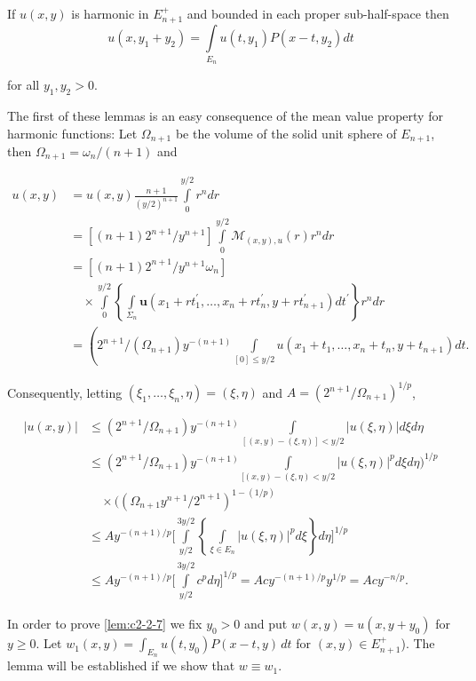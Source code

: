 \begin{lemma}
\label{lem:c2-2-7}
If $u(x, y)$ is harmonic in $E_{n+1}^{+}$ and bounded in each proper sub-half-space then
\[
u(x,y_{1}+y_{2})=\int\limits_{E_{n}}u(t,y_{1})P(x-t,y_{2})dt
\]

for all $y_{1}, y_{2} > 0$.
\end{lemma}

The first of these lemmas is an easy consequence of the mean value property for harmonic functions: Let $\Omega_{n+1}$ be the volume of the solid unit sphere of $E_{n+1}$, then $\Omega_{n+1} = \omega_n/(n+1)$ and

\[
\begin{aligned}u(x,y)&=u(x,y)\frac{n+1}{(y/2)^{n+1}}\int\limits_{0}^{y/2}r^{n} dr\\&=\left[(n+1)2^{n+1}/y^{n+1}\right]\int\limits_{0}^{y/2}\mathcal{M}_{(x,y),u}(r)r^{n} dr\\&=\left[(n+1)2^{n+1}/y^{n+1}\omega_{n}\right]\\&\quad\times\int\limits_{0}^{y/2}\left\{\int\limits_{\Sigma_{n}}\boldsymbol{u}(x_{1}+rt_{1}^{\prime},\ldots,x_{n}+rt_{n}^{\prime},y+rt_{n+1}^{\prime})dt^{\prime}\right\}r^{n} dr\\&=\left(2^{n+1}/(\Omega_{n+1})y^{-(n+1)}\int\limits_{[0]\leq y/2}u(x_{1}+t_{1},\ldots,x_{n}+t_{n},y+t_{n+1})dt.\right.\end{aligned}
\]

Consequently, letting $(\xi_1, \ldots, \xi_n, \eta) = (\xi, \eta)$ and $A = (2^{n+1}/\Omega_{n+1})^{1/p}$,

\[
\begin{aligned}|u(x,y)|&\leq(2^{n+1}/\Omega_{n+1})y^{-(n+1)}\int\limits_{[(x,y)-(\xi,\eta)]<y/2}|u(\xi,\eta)|d\xi d\eta\\&\leq(2^{n+1}/\Omega_{n+1})y^{-(n+1)}\int\limits_{[{(x,y)-(\xi,\eta)}<y/2}|u(\xi,\eta)|^{p} d\xi d\eta\Bigg)^{1/p}\\&\quad\times((\Omega_{n+1}y^{n+1}/2^{n+1})^{1-(1/p)}\\&\leq A y^{-(n+1)/p}\Bigg[\int\limits_{y/2}^{3y/2}\left\{\int\limits_{\xi\in E_{n}}|u(\xi,\eta)|^{p} d\xi\right\}d\eta\Bigg]^{1/p}\\&\leq A y^{-(n+1)/p}\Bigg[\int\limits_{y/2}^{3y/2}c^{p} d\eta\Bigg]^{1/p}=A c y^{-(n+1)/p}y^{1/p}=A c y^{-n/p}.\end{aligned}
\]

In order to prove \eqref{lem:c2-2-7} we fix $y_0 > 0$ and put $w(x, y) = u(x, y + y_0)$ for $y \geq 0$. Let $w_1(x, y) = \int_{E_n} u(t, y_0) P(x - t, y) \, dt$ for $(x, y) \in E_{n+1}^+$). The lemma will be established if we show that $w \equiv w_1$.

